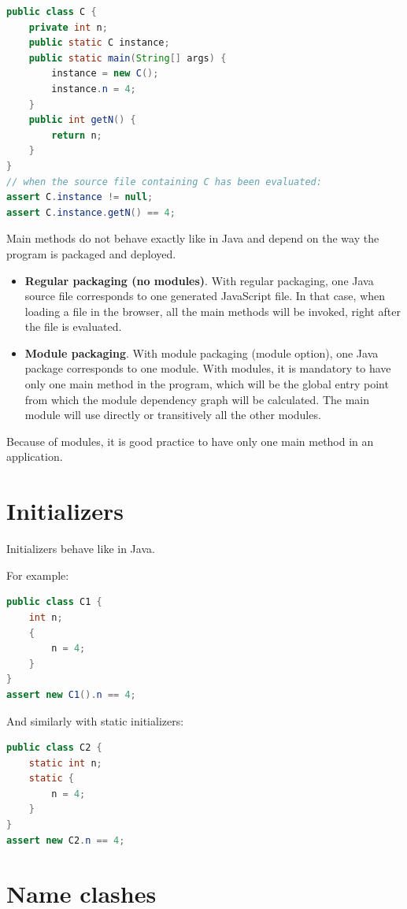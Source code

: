 \documentclass[a4paper]{report}
\begin{document}
\begin{lstlisting}[language=Java]
public class C {
	private int n;
	public static C instance;
	public static main(String[] args) {
		instance = new C();
		instance.n = 4;
	}
	public int getN() {
		return n;
	}
}
// when the source file containing C has been evaluated:
assert C.instance != null;
assert C.instance.getN() == 4;
\end{lstlisting}

Main methods do not behave exactly like in Java and depend on the way the program is packaged and deployed. 

\begin{itemize}
\item \textbf{Regular packaging (no modules)}. With regular packaging, one Java source file corresponds to one generated JavaScript file. In that case, when loading a file in the browser, all the main methods will be invoked, right after the file is evaluated. 
\item \textbf{Module packaging}. With module packaging (module option), one Java package corresponds to one module. With modules, it is mandatory to have only one main method in the program, which will be the global entry point from which the module dependency graph will be calculated. The main module will use directly or transitively all the other modules.
\end{itemize}

Because of modules, it is good practice to have only one main method in an application.

\section{Initializers}

Initializers behave like in Java.

\noindent
For example:

\begin{lstlisting}[language=Java]
public class C1 {
	int n;
	{
		n = 4;
	}
}
assert new C1().n == 4;
\end{lstlisting}

\noindent
And similarly with static initializers:

\begin{lstlisting}[language=Java]
public class C2 {
	static int n;
	static {
		n = 4;
	}
}
assert new C2.n == 4;
\end{lstlisting}


\section{Name clashes}
\end{document}
